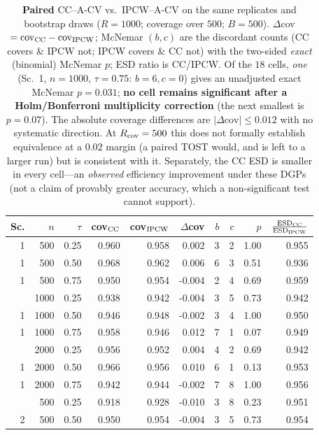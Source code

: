 \begin{table}[t]\centering\small
\caption{\textbf{Paired} CC--A-CV vs.\ IPCW--A-CV on the same replicates and bootstrap draws ($R=1000$; coverage over $500$; $B=500$). $\Delta$cov $=\mathrm{cov}_{\rm CC}-\mathrm{cov}_{\rm IPCW}$; McNemar $(b,c)$ are the discordant counts (CC covers \& IPCW not; IPCW covers \& CC not) with the two-sided \emph{exact} (binomial) McNemar $p$; ESD ratio is CC/IPCW. Of the $18$ cells, \emph{one} (Sc.~1, $n{=}1000$, $\tau{=}0.75$: $b{=}6,c{=}0$) gives an unadjusted exact McNemar $p=0.031$; \textbf{no cell remains significant after a Holm/Bonferroni multiplicity correction} (the next smallest is $p=0.07$). The absolute coverage differences are $|\Delta\mathrm{cov}|\le0.012$ with no systematic direction. At $R_{\rm cov}=500$ this does not formally establish equivalence at a $0.02$ margin (a paired TOST would, and is left to a larger run) but is consistent with it. Separately, the CC ESD is smaller in every cell---an \emph{observed} efficiency improvement under these DGPs (not a claim of provably greater accuracy, which a non-significant test cannot support).}
\label{tab:cc}\begin{tabular}{rrr rr r rr r r}\toprule
Sc.&$n$&$\tau$&cov$_{\rm CC}$&cov$_{\rm IPCW}$&$\Delta$cov&$b$&$c$&$p$&$\tfrac{\rm ESD_{CC}}{\rm ESD_{IPCW}}$\\\midrule
1 & 500 & 0.25 & 0.960 & 0.958 & 0.002 & 3 & 2 & 1.00 & 0.955 \\
1 & 500 & 0.50 & 0.968 & 0.962 & 0.006 & 6 & 3 & 0.51 & 0.936 \\
1 & 500 & 0.75 & 0.950 & 0.954 & -0.004 & 2 & 4 & 0.69 & 0.959 \\
\addlinespace
1 & 1000 & 0.25 & 0.938 & 0.942 & -0.004 & 3 & 5 & 0.73 & 0.942 \\
1 & 1000 & 0.50 & 0.946 & 0.948 & -0.002 & 3 & 4 & 1.00 & 0.950 \\
1 & 1000 & 0.75 & 0.958 & 0.946 & 0.012 & 7 & 1 & 0.07 & 0.949 \\
\addlinespace
1 & 2000 & 0.25 & 0.956 & 0.952 & 0.004 & 4 & 2 & 0.69 & 0.942 \\
1 & 2000 & 0.50 & 0.966 & 0.956 & 0.010 & 6 & 1 & 0.13 & 0.953 \\
1 & 2000 & 0.75 & 0.942 & 0.944 & -0.002 & 7 & 8 & 1.00 & 0.956 \\
\addlinespace
2 & 500 & 0.25 & 0.918 & 0.928 & -0.010 & 3 & 8 & 0.23 & 0.951 \\
2 & 500 & 0.50 & 0.950 & 0.954 & -0.004 & 3 & 5 & 0.73 & 0.954 \\

\end{tabular}
\end{table}
